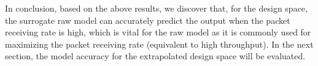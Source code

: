 

 



In conclusion, based on the above results, we discover that, for the design space, the surrogate \gls{raw} model can accurately predict the output when the packet receiving rate is high, which is vital for the \gls{raw} model as it is commonly used for maximizing the packet receiving rate (equivalent to high throughput). In the next section, the model accuracy for the extrapolated design space will be evaluated.

